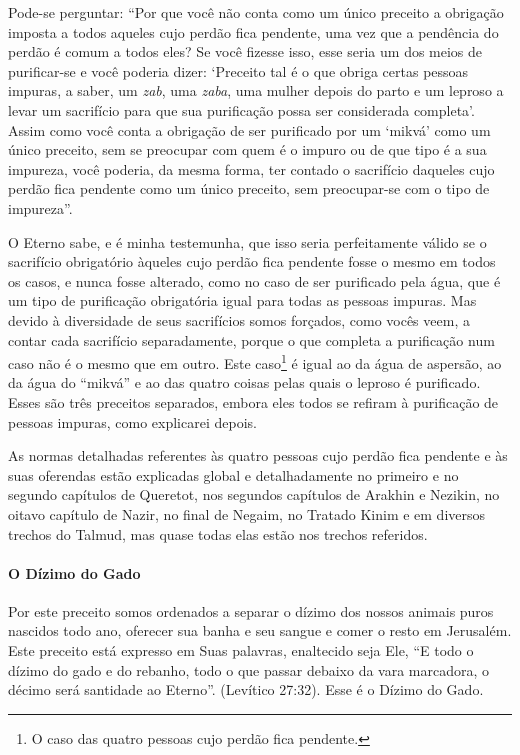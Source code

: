 Pode-se perguntar: ``Por que você não conta como um único preceito a
obrigação imposta a todos aqueles cujo perdão fica pendente, uma vez que
a pendência do perdão é comum a todos eles? Se você fizesse isso, esse
seria um dos meios de purificar-se e você poderia dizer: `Preceito tal é
o que obriga certas pessoas impuras, a saber, um \emph{zab}, uma
\emph{zaba}, uma mulher depois do parto e um leproso a levar um
sacrifício para que sua purificação possa ser considerada completa'.
Assim como você conta a obrigação de ser purificado por um `mikvá' como
um único preceito, sem se preocupar com quem é o impuro ou de que tipo é
a sua impureza, você poderia, da mesma forma, ter contado o sacrifício daqueles cujo perdão fica pendente como um único
preceito, sem preocupar-se com o tipo de impureza''.

O Eterno sabe, e é minha testemunha, que isso seria perfeitamente válido
se o sacrifício obrigatório àqueles cujo perdão fica pendente fosse o
mesmo em todos os casos, e nunca fosse alterado, como no caso de ser
purificado pela água, que é um tipo de purificação obrigatória igual
para todas as pessoas impuras. Mas devido à diversidade de seus
sacrifícios somos forçados, como vocês veem, a contar cada sacrifício
separadamente, porque o que completa a purificação num caso não é o
mesmo que em outro. Este caso\footnote{O caso das quatro pessoas cujo perdão fica pendente.} é igual ao da água
de aspersão, ao da água do ``mikvá'' e ao das quatro coisas pelas quais
o leproso é purificado. Esses são três preceitos separados, embora eles
todos se refiram à purificação de pessoas impuras, como explicarei
depois.

As normas detalhadas referentes às quatro pessoas cujo perdão fica
pendente e às suas oferendas estão explicadas global e detalhadamente no
primeiro e no segundo capítulos de Queretot, nos segundos capítulos de
Arakhin e Nezikin, no oitavo capítulo de Nazir, no final de Negaim, no
Tratado Kinim e em diversos trechos do Talmud, mas quase todas elas
estão nos trechos referidos.

\paragraph{O Dízimo do Gado}

Por este preceito somos ordenados a separar o dízimo dos nossos animais
puros nascidos todo ano, oferecer sua banha e seu sangue e comer o resto
em Jerusalém. Este preceito está expresso em Suas palavras, enaltecido
seja Ele, ``E todo o dízimo do gado e do rebanho, todo o que passar
debaixo da vara marcadora, o décimo será santidade ao Eterno''.
(Levítico 27:32). Esse é o Dízimo do Gado.

